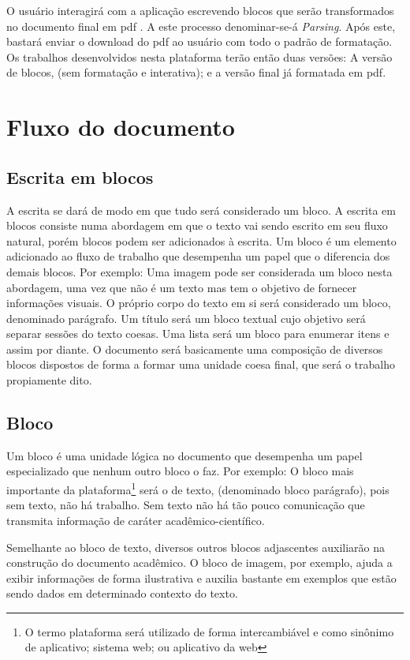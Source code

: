 O usuário interagirá com a aplicação escrevendo blocos que serão transformados
no documento final em
\acrshort{pdf}
. A este processo denominar-se-á \textit{Parsing}. Após este, bastará
enviar o download do \acrshort{pdf}
ao usuário com todo o padrão de formatação. Os trabalhos desenvolvidos nesta plataforma
terão então duas versões: A versão de blocos, (sem formatação e interativa); e a versão
final já formatada em \acrshort{pdf}.

\section{Fluxo do documento}

\subsection{Escrita em blocos}

A escrita se dará de modo em que tudo será considerado um bloco.
A escrita em blocos consiste numa abordagem em que o texto vai sendo
escrito em seu fluxo natural, porém blocos podem ser adicionados à escrita.
Um bloco é um elemento adicionado ao fluxo de trabalho que desempenha um papel
que o diferencia dos demais blocos.
Por exemplo: Uma imagem pode ser considerada um bloco nesta abordagem, uma vez
que não é um texto mas tem o objetivo de fornecer informações visuais. O próprio corpo
do texto em si será considerado um bloco, denominado parágrafo. Um título será um bloco
textual cujo objetivo será separar sessões do texto coesas. Uma lista será um bloco para enumerar
itens e assim por diante. O documento será basicamente uma composição de diversos blocos dispostos de forma a formar
uma unidade coesa final, que será o trabalho propiamente dito.

\subsection{Bloco}

Um bloco é uma unidade lógica no documento que desempenha um papel especializado que nenhum
outro bloco o faz. Por exemplo: O bloco mais importante da
plataforma\footnote{O termo plataforma será utilizado
    de forma intercambiável e como sinônimo de aplicativo; sistema web; ou aplicativo da web}
será o de texto, (denominado bloco parágrafo), pois sem texto, não há trabalho.
Sem texto não há tão pouco comunicação que transmita informação
de caráter acadêmico-científico.

Semelhante ao bloco de texto, diversos outros blocos adjascentes
auxiliarão na construção do documento acadêmico. O bloco de imagem, por
exemplo, ajuda a exibir informações de forma ilustrativa e auxilia bastante
em exemplos que estão sendo dados em determinado contexto do texto.

